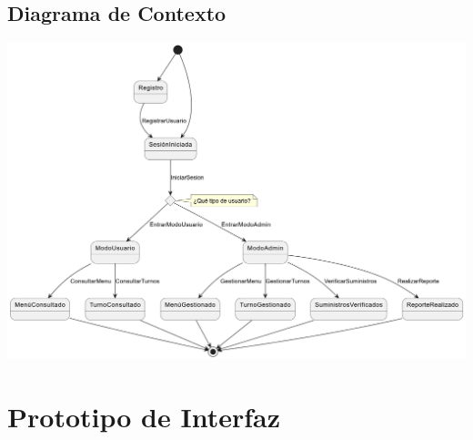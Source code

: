 \documentclass[12pt]{article}
\begin{document}
\begin{landscape}
	\section{Diagrama de Contexto}
	\vspace{1cm}
	\begin{center}
		\includegraphics[width=19cm]{Requirements Discipline - Context Diagram.png}
	\end{center}
\end{landscape}

\pagebreak

\section{Prototipo de Interfaz}
\vspace{1cm}
\begin{center}
\end{center}
\end{document}
